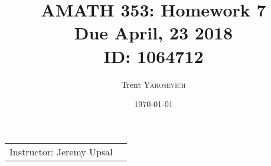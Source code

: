 \documentclass{article}
\title{AMATH 353: Homework 7 \\Due April, 23 2018 \\ ID: 1064712} %
\author{Trent \textsc{Yarosevich}} %
\date{\today} %
\begin{document}
\maketitle %
\setlength\parindent{1cm}

\begin{center}
\begin{tabular}{l r}
Instructor: Jeremy Upsal %
\end{tabular}
\end{center}


\end{document}
